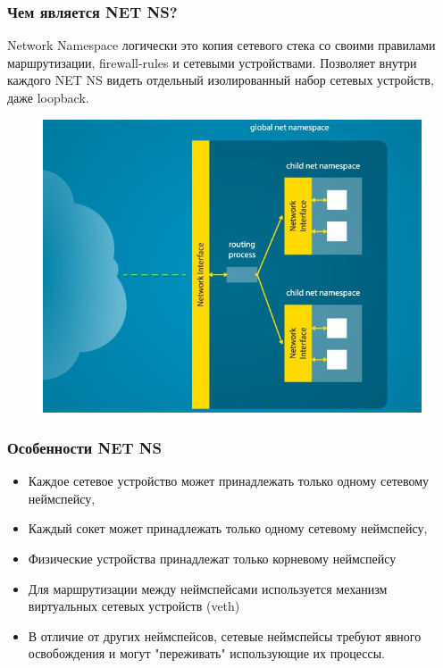 \begin{frame}[label={net_ns_usage}]
\frametitle{Чем является NET NS?}
    \alert{Network Namespace} \textemdash{} логически это копия сетевого стека со своими правилами маршрутизации, firewall-rules и сетевыми устройствами. Позволяет внутри каждого NET NS видеть отдельный изолированный набор сетевых устройств, даже loopback.
\end{frame}

\begin{frame}[fragile]
    \begin{figure}
    \centering
    \includegraphics[scale=0.46]{net_ns.jpg}
    \end{figure}
\end{frame}

\begin{frame}[label={net_ns_features}]
\frametitle{Особенности NET NS}
\begin{itemize}
    \item Каждое сетевое устройство может принадлежать только одному сетевому неймспейсу,
    \item Каждый сокет может принадлежать только одному сетевому неймспейсу,
    \item Физические устройства принадлежат только корневому неймспейсу
    \item Для маршрутизации между неймспейсами используется механизм \alert{виртуальных сетевых устройств (veth)}
    \item В отличие от других неймспейсов, сетевые неймспейсы требуют явного освобождения и могут "переживать" использующие их процессы.
\end{itemize}
\end{frame}

